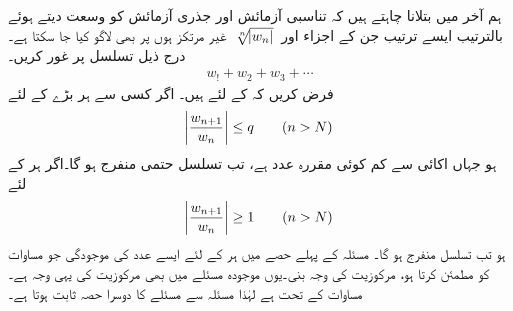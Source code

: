 ہم آخر میں بتلانا چاہتے ہیں کہ تناسبی آزمائش اور جذری آزمائش کو وسعت دیتے ہوئے بالترتیب  ایسے ترتیب جن کے اجزاء  اور 
$\,\sqrt[\leftroot{-2}n]{\abs{w_n}}\,$
غیر مرتکز ہوں پر بھی لاگو کیا جا سکتا ہے۔
\quad {}\\
درج ذیل تسلسل پر غور کریں۔
\begin{align*}
w_!+w_2+w_3+\cdots
\end{align*}
فرض کریں کہ  کے لئے  ہیں۔ اگر کسی  سے ہر بڑے  کے لئے
\begin{align}\label{مساوات_ترتیب_تناسبی_الف}
\abs{\frac{w_{n+1}}{w_n}}\le q\quad \quad (n>N)
\end{align}
ہو جہاں  اکائی سے کم کوئی مقررہ عدد ہے، تب تسلسل حتمی منفرج ہو گا۔اگر ہر  کے لئے 
\begin{align}\label{مساوات_ترتیب_تناسبی_ب}
\abs{\frac{w_{n+1}}{w_n}}\ge 1\quad \quad (n>N)
\end{align}
ہو تب تسلسل منفرج ہو گا۔
\quad
مسئلہ  کے پہلے حصے میں ہر  کے لئے ایسے عدد  کی موجودگی  جو مساوات  کو مطمئن کرتا ہو، مرکوزیت کی وجہ بنی۔یوں موجودہ مسئلے میں بھی مرکوزیت کی یہی وجہ ہے۔مساوات  کے تحت  ہے لہٰذا   مسئلہ سے مسئلے کا دوسرا حصہ ثابت ہوتا ہے۔


